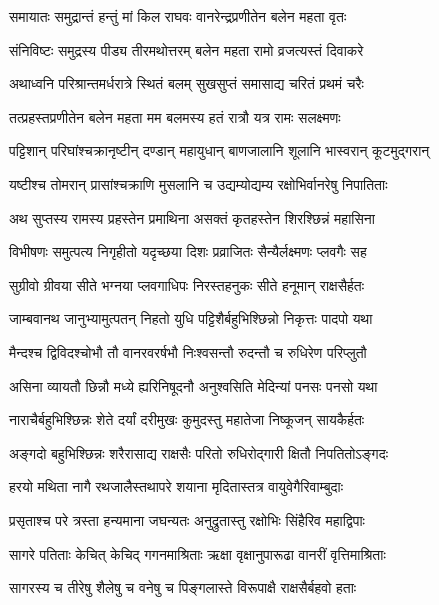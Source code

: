 \twolineshloka
{समायातः समुद्रान्तं हन्तुं मां किल राघवः}
{वानरेन्द्रप्रणीतेन बलेन महता वृतः} %

\twolineshloka
{संनिविष्टः समुद्रस्य पीड्य तीरमथोत्तरम्}
{बलेन महता रामो व्रजत्यस्तं दिवाकरे} %

\twolineshloka
{अथाध्वनि परिश्रान्तमर्धरात्रे स्थितं बलम्}
{सुखसुप्तं समासाद्य चरितं प्रथमं चरैः} %

\twolineshloka
{तत्प्रहस्तप्रणीतेन बलेन महता मम}
{बलमस्य हतं रात्रौ यत्र रामः सलक्ष्मणः} %

\twolineshloka
{पट्टिशान् परिघांश्चक्रानृष्टीन् दण्डान् महायुधान्}
{बाणजालानि शूलानि भास्वरान् कूटमुद्गरान्} %

\twolineshloka
{यष्टीश्च तोमरान् प्रासांश्चक्राणि मुसलानि च}
{उद्यम्योद्यम्य रक्षोभिर्वानरेषु निपातिताः} %

\twolineshloka
{अथ सुप्तस्य रामस्य प्रहस्तेन प्रमाथिना}
{असक्तं कृतहस्तेन शिरश्छिन्नं महासिना} %

\twolineshloka
{विभीषणः समुत्पत्य निगृहीतो यदृच्छया}
{दिशः प्रव्राजितः सैन्यैर्लक्ष्मणः प्लवगैः सह} %

\twolineshloka
{सुग्रीवो ग्रीवया सीते भग्नया प्लवगाधिपः}
{निरस्तहनुकः सीते हनूमान् राक्षसैर्हतः} %

\twolineshloka
{जाम्बवानथ जानुभ्यामुत्पतन् निहतो युधि}
{पट्टिशैर्बहुभिश्छिन्नो निकृत्तः पादपो यथा} %

\twolineshloka
{मैन्दश्च द्विविदश्चोभौ तौ वानरवरर्षभौ}
{निःश्वसन्तौ रुदन्तौ च रुधिरेण परिप्लुतौ} %

\twolineshloka
{असिना व्यायतौ छिन्नौ मध्ये ह्यरिनिषूदनौ}
{अनुश्वसिति मेदिन्यां पनसः पनसो यथा} %

\twolineshloka
{नाराचैर्बहुभिश्छिन्नः शेते दर्यां दरीमुखः}
{कुमुदस्तु महातेजा निष्कूजन् सायकैर्हतः} %

\twolineshloka
{अङ्गदो बहुभिश्छिन्नः शरैरासाद्य राक्षसैः}
{परितो रुधिरोद्गारी क्षितौ निपतितोऽङ्गदः} %

\twolineshloka
{हरयो मथिता नागै रथजालैस्तथापरे}
{शयाना मृदितास्तत्र वायुवेगैरिवाम्बुदाः} %

\twolineshloka
{प्रसृताश्च परे त्रस्ता हन्यमाना जघन्यतः}
{अनुद्रुतास्तु रक्षोभिः सिंहैरिव महाद्विपाः} %

\twolineshloka
{सागरे पतिताः केचित् केचिद् गगनमाश्रिताः}
{ऋक्षा वृक्षानुपारूढा वानरीं वृत्तिमाश्रिताः} %

\twolineshloka
{सागरस्य च तीरेषु शैलेषु च वनेषु च}
{पिङ्गलास्ते विरूपाक्षै राक्षसैर्बहवो हताः} %

